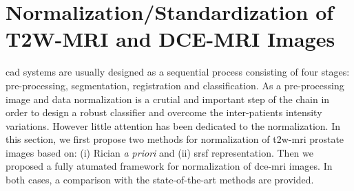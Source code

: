 \chapter{Normalization/Standardization of T2W-MRI and DCE-MRI Images} \label{chap:5}
\Ac{cad} systems are usually designed as a sequential process consisting of four stages: pre-processing, segmentation, registration and classification.
As a pre-processing image and data normalization is a crutial and important step of the chain in order to design a robust classifier and overcome the inter-patients intensity variations.
However little attention has been dedicated to the normalization.
In this section, we first propose two methods for normalization of \ac{t2w}-\ac{mri} prostate images based on: (i) Rician \emph{a priori} and (ii) \ac{srsf} representation.
Then we proposed a fully atumated framework for normalization of \ac{dce}-\ac{mri} images.
In both cases, a comparison with the state-of-the-art methods are provided.






